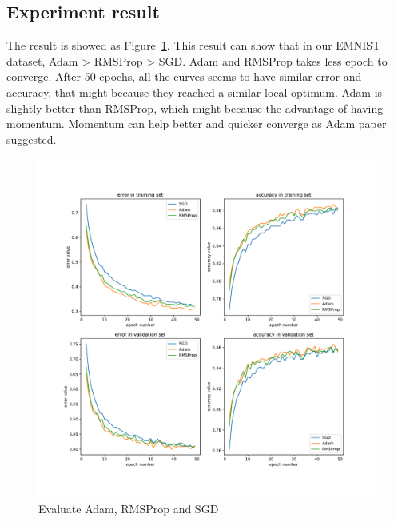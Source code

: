 \documentclass{article}
\begin{document}
\subsection{Experiment result}
The result is showed as Figure~\ref{fig:lr}. This result can show that in our EMNIST dataset,  Adam > RMSProp > SGD. Adam and RMSProp takes less epoch to converge. After 50 epochs, all the curves seems to have similar error and accuracy, that might because they reached a similar local optimum. Adam is slightly better than RMSProp, which might because the advantage of having momentum. Momentum can help better and quicker converge as Adam paper suggested.

\begin{figure}[tb]
\begin{center}
\centerline{\includegraphics[width=\columnwidth]{fig/lr.pdf}}
\caption{Evaluate Adam, RMSProp and SGD}
\label{fig:lr}
\end{center}
\end{figure} 



\end{document}

